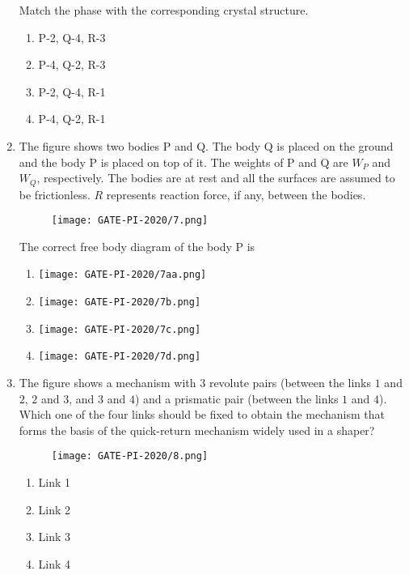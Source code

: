 \documentclass[journal,12pt,onecolumn]{IEEEtran}
\theoremstyle{remark}
\begin{document}
\begin{enumerate}
Match the phase with the corresponding crystal structure.
\begin{multicols}{4}
\begin{enumerate}
    \item P-2, Q-4, R-3
    \item P-4, Q-2, R-3
    \item P-2, Q-4, R-1
    \item P-4, Q-2, R-1
\end{enumerate}
\end{multicols}
\vspace{1cm}
\newpage
\item The figure shows two bodies P and Q. The body Q is placed on the ground and the body P is placed on top of it. The weights of P and Q are $W_P$ and $W_Q$, respectively. The bodies are at rest and all the surfaces are assumed to be frictionless. $R$ represents reaction force, if any, between the bodies.

\begin{figure}[H]
    \centering
    \texttt{[image: GATE-PI-2020/7.png]}
    \caption{}
    \label{7}
\end{figure}

The correct free body diagram of the body P is
\begin{enumerate}
    \item \texttt{[image: GATE-PI-2020/7aa.png]} 
    \item \texttt{[image: GATE-PI-2020/7b.png]} 
    \item \texttt{[image: GATE-PI-2020/7c.png]}
    \item \texttt{[image: GATE-PI-2020/7d.png]}
\end{enumerate}
\vspace{1cm}

\item The figure shows a mechanism with $3$ revolute pairs (between the links $1$ and $2$, $2$ and $3$, and $3$ and $4$) and a prismatic pair (between the links $1$ and $4$). Which one of the four links should be fixed to obtain the mechanism that forms the basis of the quick-return mechanism widely used in a shaper?
\begin{figure}[H]
    \centering
    \texttt{[image: GATE-PI-2020/8.png]} 
    \caption{}
    \label{8}
\end{figure}
\begin{multicols}{4}
\begin{enumerate}
    \item Link 1
    \item Link 2
    \item Link 3
    \item Link 4
\end{enumerate}
\end{multicols}
\vspace{1cm}


\end{enumerate}
\end{document}
